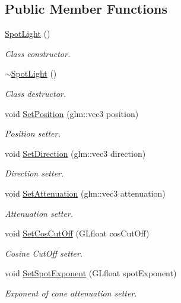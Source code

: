 \subsection*{Public Member Functions}
\begin{DoxyCompactItemize}
\item 
\hyperlink{class_spot_light_ae4045cd7c8c6d18af39b57c9cf6f9ce6}{Spot\+Light} ()
\begin{DoxyCompactList}\small\item\em Class constructor. \end{DoxyCompactList}\item 
\hyperlink{class_spot_light_aa16b741d73aa198c203ce40a066a115c}{$\sim$\+Spot\+Light} ()
\begin{DoxyCompactList}\small\item\em Class destructor. \end{DoxyCompactList}\item 
void \hyperlink{class_spot_light_a66a62acf516440ac717b4aa464c3c94a}{Set\+Position} (glm\+::vec3 position)
\begin{DoxyCompactList}\small\item\em Position setter. \end{DoxyCompactList}\item 
void \hyperlink{class_spot_light_ac8239339ffa7dd31ea07a4cdcc36c4f4}{Set\+Direction} (glm\+::vec3 direction)
\begin{DoxyCompactList}\small\item\em Direction setter. \end{DoxyCompactList}\item 
void \hyperlink{class_spot_light_addcb3fc1007d25b33f4275ff16f26073}{Set\+Attenuation} (glm\+::vec3 attenuation)
\begin{DoxyCompactList}\small\item\em Attenuation setter. \end{DoxyCompactList}\item 
void \hyperlink{class_spot_light_ac7a4c2343ed2d8da4f2511d50318cb5f}{Set\+Cos\+Cut\+Off} (G\+Lfloat cos\+Cut\+Off)
\begin{DoxyCompactList}\small\item\em Cosine Cut\+Off setter. \end{DoxyCompactList}\item 
void \hyperlink{class_spot_light_aa45ba8d849a2a9a994f144c2610fa498}{Set\+Spot\+Exponent} (G\+Lfloat spot\+Exponent)
\begin{DoxyCompactList}\small\item\em Exponent of cone attenuation setter. \end{DoxyCompactList}\end{DoxyCompactItemize}
